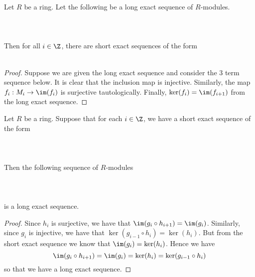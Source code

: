 \documentclass[a4paper]{article}
\begin{document}
\begin{prp}{}{} Let $R$ be a ring. Let the following be a long exact sequence of $R$-modules. \\~\\
\\~\\
Then for all $i\in\Z$, there are short exact sequences of the form \\~\\
 \tcbline
\begin{proof}
Suppose we are given the long exact sequence and consider the 3 term sequence below. It is clear that the inclusion map is injective. Similarly, the map $f_i:M_i\to\im(f_i)$ is surjective tautologically. Finally, $\ker(f_i)=\im(f_{i+1})$ from the long exact sequence. 
\end{proof}
\end{prp}

\begin{prp}{}{} Let $R$ be a ring. Suppose that for each $i\in\Z$, we have a short exact sequence of the form \\~\\
 \\~\\
Then the following sequence of $R$-modules \\~\\
\\~\\
is a long exact sequence. \tcbline
\begin{proof}
Since $h_i$ is surjective, we have that $\im(g_i\circ h_{i+1})=\im(g_i)$. Similarly, since $g_i$ is injective, we have that $\ker(g_{i-1}\circ h_i)=\ker(h_i)$. But from the short exact sequence we know that $\im(g_i)=\ker(h_i)$. Hence we have $$\im(g_i\circ h_{i+1})=\im(g_i)=\ker(h_i)=\ker(g_{i-1}\circ h_i)$$ so that we have a long exact sequence. 
\end{proof}
\end{prp}
\end{document}
